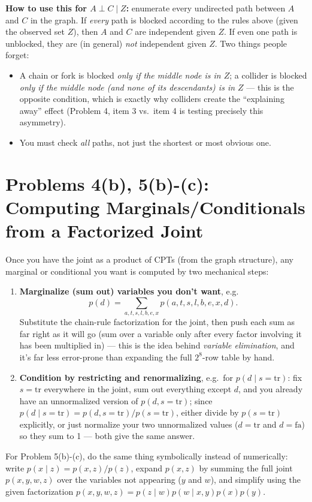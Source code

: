 \documentclass[11pt]{article}
\begin{document}
\textbf{How to use this for $A \perp C \mid Z$:} enumerate every
undirected path between $A$ and $C$ in the graph. If \emph{every} path
is blocked according to the rules above (given the observed set $Z$),
then $A$ and $C$ are independent given $Z$. If even one path is
unblocked, they are (in general) \emph{not} independent given $Z$.
Two things people forget:
\begin{itemize}
  \item A chain or fork is blocked \emph{only if the middle node is in
        $Z$}; a collider is blocked \emph{only if the middle node
        (and none of its descendants) is in $Z$} --- this is the
        opposite condition, which is exactly why colliders create the
        ``explaining away'' effect (Problem 4, item 3 vs.\ item 4 is
        testing precisely this asymmetry).
  \item You must check \emph{all} paths, not just the shortest or most
        obvious one.
\end{itemize}

\section*{Problems 4(b), 5(b)-(c): Computing Marginals/Conditionals from a Factorized Joint}

Once you have the joint as a product of CPTs (from the graph structure),
any marginal or conditional you want is computed by two mechanical
steps:

\begin{enumerate}
  \item \textbf{Marginalize (sum out) variables you don't want}, e.g.
        \[
          p(d) = \sum_{a,t,s,l,b,e,x} p(a,t,s,l,b,e,x,d).
        \]
        Substitute the chain-rule factorization for the joint, then push
        each sum as far right as it will go (sum over a variable only
        after every factor involving it has been multiplied in) ---
        this is the idea behind \emph{variable elimination}, and it's
        far less error-prone than expanding the full $2^8$-row table by
        hand.
  \item \textbf{Condition by restricting and renormalizing}, e.g.\ for
        $p(d \mid s = \text{tr})$: fix $s=\text{tr}$ everywhere in the
        joint, sum out everything except $d$, and you already have an
        unnormalized version of $p(d, s=\text{tr})$; since
        $p(d\mid s=\text{tr}) = p(d,s=\text{tr})/p(s=\text{tr})$, either
        divide by $p(s=\text{tr})$ explicitly, or just normalize your
        two unnormalized values ($d=\text{tr}$ and $d=\text{fa}$) so
        they sum to 1 --- both give the same answer.
\end{enumerate}
For Problem 5(b)-(c), do the same thing symbolically instead of
numerically: write $p(x\mid z) = p(x,z)/p(z)$, expand $p(x,z)$ by
summing the full joint $p(x,y,w,z)$ over the variables not appearing
($y$ and $w$), and simplify using the given factorization
$p(x,y,w,z)=p(z\mid w)p(w\mid x,y)p(x)p(y)$.
\end{document}
